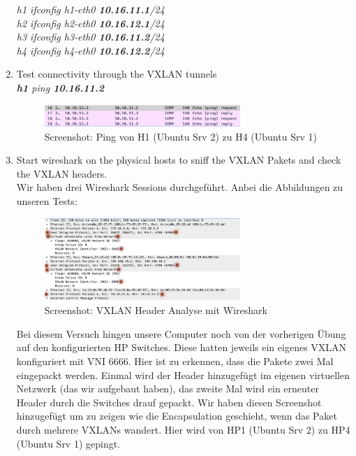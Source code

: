 \documentclass[a4,12pt]{scrartcl}
\begin{document}
\begin{enumerate}
\textit{h1 ifconfig h1-eth0 \textbf{10.16.11.1}/24}\\
\textit{h2 ifconfig h2-eth0 \textbf{10.16.12.1}/24}\\
\textit{h3 ifconfig h3-eth0 \textbf{10.16.11.2}/24}\\
\textit{h4 ifconfig h4-eth0 \textbf{10.16.12.2}/24}
\item Test connectivity through the VXLAN tunnels\\
\textit{\textbf{h1} ping \textbf{10.16.11.2}}
\begin{figure} [H]
	\begin{center}
	\includegraphics[width=0.70\textwidth]{./pictures/vxlan_pingtest.png}
	\caption{Screenshot: Ping von H1 (Ubuntu Srv 2) zu H4 (Ubuntu Srv 1)}
	\label{x}
	\end{center}
\end{figure}
\item Start wireshark on the physical hosts to sniff the VXLAN Pakets and check the VXLAN headers.\\
Wir haben drei Wireshark Sessions durchgeführt. Anbei die Abbildungen zu unseren Tests: 
\begin{figure} [H]
	\begin{center}
	\includegraphics[width=0.70\textwidth]{./pictures/vxlan_sniff.png}
	\caption{Screenshot: VXLAN Header Analyse mit Wireshark}
	\label{x}
	\end{center}
\end{figure}
Bei diesem Versuch hingen unsere Computer noch von der vorherigen Übung auf den konfigurierten HP Switches. Diese hatten jeweils ein eigenes VXLAN konfiguriert mit VNI 6666. Hier ist zu erkennen, dass die Pakete zwei Mal eingepackt werden. Einmal wird der Header hinzugefügt im eigenen virtuellen Netzwerk (das wir aufgebaut haben), das zweite Mal wird ein erneuter Header durch die Switches drauf gepackt. Wir haben diesen Screenshot hinzugefügt um zu zeigen wie die Encapsulation geschieht, wenn das Paket durch mehrere VXLANs wandert. Hier wird von HP1 (Ubuntu Srv 2) zu HP4 (Ubuntu Srv 1) gepingt. 

\end{enumerate}
\end{document}
